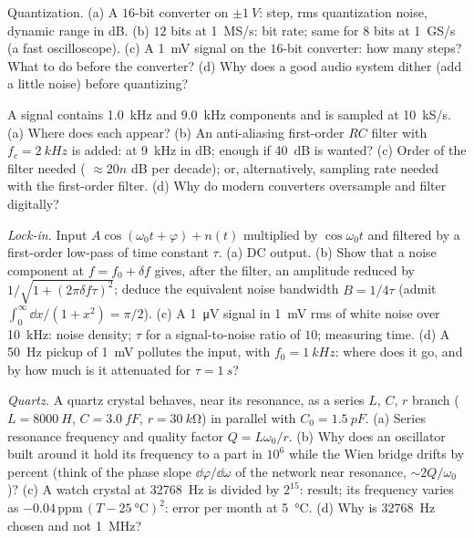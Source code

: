 \begin{exercise}[$\star\star$]\label{exo:b2:feedback-oscillators:8}
Quantization. (a) A $16$-bit converter on $\pm\qty{1}{V}$: step, rms
quantization noise, dynamic range in dB. (b) $12$ bits at
\qty{1}{MS/s}: bit rate; same for $8$ bits at \qty{1}{GS/s} (a fast
oscilloscope). (c) A \qty{1}{mV} signal on the $16$-bit converter: how many
steps? What to do before the converter? (d) Why does a good audio
system dither (add a little noise) before quantizing?
\end{exercise}

\begin{exercise}[$\star\star$]\label{exo:b2:feedback-oscillators:9}
A signal contains \qty{1.0}{kHz} and \qty{9.0}{kHz} components and is
sampled at \qty{10}{kS/s}. (a) Where does each appear? (b) An
anti-aliasing first-order $RC$ filter with $f_c = \qty{2}{kHz}$ is added:
 at \qty{9}{kHz} in dB; enough if \qty{40}{dB} is wanted? (c)
Order of the filter needed ( $\approx 20n$ dB per decade); or,
alternatively, sampling rate needed with the first-order filter. (d)
Why do modern converters oversample and filter digitally?
\end{exercise}

\begin{exercise}[$\star\star\star$]\label{exo:b2:feedback-oscillators:10}
\emph{Lock-in.} Input $A\cos(\omega_0t + \varphi) + n(t)$ multiplied by $\cos\omega_0t$
and filtered by a first-order low-pass of time constant $\tau$. (a) DC
output. (b) Show that a noise component at $f = f_0 + \delta f$ gives, after
the filter, an amplitude reduced by $1/\sqrt{1 + (2\pi\delta f\tau)^2}$;
deduce the equivalent noise bandwidth $B = 1/4\tau$ (admit $\int_0^\infty
\dd x/(1 + x^2) = \pi/2$). (c) A \qty{1}{\micro V} signal in \qty{1}{mV} rms of
white noise over \qty{10}{kHz}: noise density; $\tau$ for a signal-to-noise
ratio of $10$; measuring time. (d) A \qty{50}{Hz} pickup of \qty{1}{mV}
pollutes the input, with $f_0 = \qty{1}{kHz}$: where does it go, and by
how much is it attenuated for $\tau = \qty{1}{s}$?
\end{exercise}

\begin{exercise}[$\star\star\star$]\label{exo:b2:feedback-oscillators:11}
\emph{Quartz.} A quartz crystal behaves, near its resonance, as a
series $L$, $C$, $r$ branch ($L = \qty{8000}{H}$, $C = \qty{3.0}{fF}$, $r =
\qty{30}{k\ohm}$) in parallel with $C_0 = \qty{1.5}{pF}$. (a) Series resonance
frequency and quality factor $Q = L\omega_0/r$. (b) Why does an oscillator
built around it hold its frequency to a part in $10^6$ while the Wien
bridge drifts by percent (think of the phase slope $\dd\varphi/\dd\omega$ of
the  network near resonance, $\sim 2Q/\omega_0$)? (c) A watch
crystal at \qty{32768}{Hz} is divided by $2^{15}$: result; its frequency
varies as $-0.04\,\text{ppm}\,(T - \qty{25}{\degreeCelsius})^2$: error per
month at \qty{5}{\degreeCelsius}. (d) Why is \qty{32768}{Hz} chosen and not
\qty{1}{MHz}?
\end{exercise}


